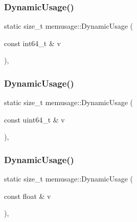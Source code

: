\mbox{\label{namespacememusage_a3ca0c4527f3847272d6c61c5f1f6825a}} 
\subsubsection{\texorpdfstring{Dynamic\+Usage()}{DynamicUsage()}\hspace{0.1cm}{\footnotesize\ttfamily [7/18]}}
{\footnotesize\ttfamily static size\+\_\+t memusage\+::\+Dynamic\+Usage (\begin{DoxyParamCaption}\item[{const int64\+\_\+t \&}]{v }\end{DoxyParamCaption})\hspace{0.3cm}{\ttfamily [inline]}, {\ttfamily [static]}}

\mbox{\label{namespacememusage_a920f8ca7a8fde31a5c02699b16a47183}} 
\subsubsection{\texorpdfstring{Dynamic\+Usage()}{DynamicUsage()}\hspace{0.1cm}{\footnotesize\ttfamily [8/18]}}
{\footnotesize\ttfamily static size\+\_\+t memusage\+::\+Dynamic\+Usage (\begin{DoxyParamCaption}\item[{const uint64\+\_\+t \&}]{v }\end{DoxyParamCaption})\hspace{0.3cm}{\ttfamily [inline]}, {\ttfamily [static]}}

\mbox{\label{namespacememusage_a43d740dc101dc4ecb6368281f79e7e17}} 
\subsubsection{\texorpdfstring{Dynamic\+Usage()}{DynamicUsage()}\hspace{0.1cm}{\footnotesize\ttfamily [9/18]}}
{\footnotesize\ttfamily static size\+\_\+t memusage\+::\+Dynamic\+Usage (\begin{DoxyParamCaption}\item[{const float \&}]{v }\end{DoxyParamCaption})\hspace{0.3cm}{\ttfamily [inline]}, {\ttfamily [static]}}

